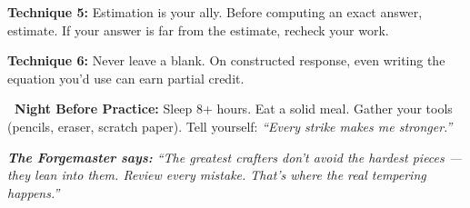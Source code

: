 {\begin{minipage}[t]{0.48\linewidth}
    \vspace{1.5mm}

    \begin{tcolorbox}[
        enhanced,
        colback=funBlue!5,
        colframe=funBlue!30,
        arc=6pt, boxrule=1pt,
        left=3mm, right=3mm, top=2mm, bottom=2mm,
    ]
        \small
        \textcolor{funBlueDark}{\bfseries Technique 5:}
        Estimation is your ally. Before computing an exact answer,
        estimate. If your answer is far from the estimate,
        recheck your work.
    \end{tcolorbox}

    \vspace{1.5mm}

    \begin{tcolorbox}[
        enhanced,
        colback=funPurple!5,
        colframe=funPurple!30,
        arc=6pt, boxrule=1pt,
        left=3mm, right=3mm, top=2mm, bottom=2mm,
    ]
        \small
        \textcolor{funPurpleDark}{\bfseries Technique 6:}
        Never leave a blank. On constructed response,
        even writing the equation you'd use can earn
        partial credit.
    \end{tcolorbox}
\end{minipage}

\vspace{3mm}

\begin{tcolorbox}[
    enhanced,
    colback=funOrange!4,
    colframe=funOrange!20,
    arc=8pt, boxrule=0.8pt,
    left=5mm, right=5mm, top=3mm, bottom=3mm,
]
    \small\sffamily
    \textcolor{funOrangeDark}{\bfseries\faMoon~Night Before Practice:}
    Sleep 8+ hours.
    Eat a solid meal.
    Gather your tools (pencils, eraser, scratch paper).
    Tell yourself: \textit{``Every strike makes me stronger.''}
\end{tcolorbox}

\vspace{2mm}

\begin{tcolorbox}[
    enhanced,
    colback=funYellow!8,
    colframe=funYellowDark!25,
    arc=10pt, boxrule=0.8pt,
    left=5mm, right=5mm, top=3mm, bottom=3mm,
]
    \begin{minipage}[c]{0.07\linewidth}
        \centering \iconOwl[1cm]
    \end{minipage}%
    \hfill
    \begin{minipage}[c]{0.90\linewidth}
        \small\itshape\color{funOrangeDark}
        \textbf{The Forgemaster says:} ``The greatest crafters don't avoid
        the hardest pieces --- they lean into them. Review every mistake.
        That's where the real tempering happens.''
    \end{minipage}
\end{tcolorbox}

}

\newpage
